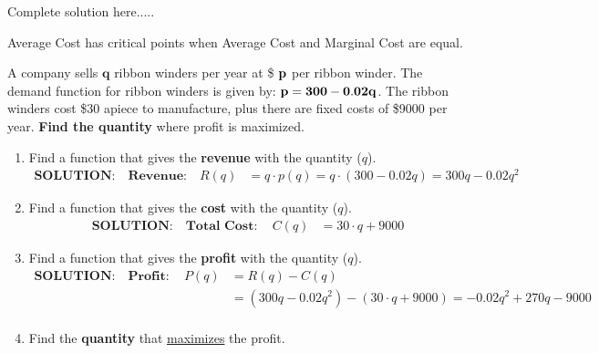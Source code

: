 \begin{example}
\begin{sol}
    \end{sol}
    \begin{solL}
    Complete solution here.....
    
    \end{solL}
    
\end{example}

\begin{tcolorbox}
Average Cost has critical points when Average Cost and Marginal Cost are equal.
\end{tcolorbox}

\newpage
\begin{example}
A company sells $\bm q$ ribbon winders per year at \$ $\bf{p}$ per ribbon winder. The demand function for ribbon winders is given by: $\bf{p=300-0.02q}$. The ribbon winders cost \$30 apiece to manufacture, plus there are fixed costs of \$9000 per year. \textbf{Find the quantity} where profit is maximized.
\renewcommand{\labelenumi}{(\alph{enumi})}
\begin{enumerate}[leftmargin=*]
    \item Find a function that gives the \textbf{revenue} with the quantity ($q$).\\
    	\begin{displaymath}
		\begin{split}
		\textbf{SOLUTION:} \quad	\textbf{Revenue:}\quad R(q) &=q\cdot p(q)=q\cdot (300-0.02q)=300q-0.02q^2
		\end{split}
	\end{displaymath}
    \item Find a function that gives the \textbf{cost} with the quantity ($q$).\\
    	\begin{displaymath}
		\begin{split}
		\textbf{SOLUTION:} \quad	\textbf{Total Cost}:\quad C(q) &=30\cdot q+9000
		\end{split}
	\end{displaymath}
    \item Find a function that gives the \textbf{profit} with the quantity ($q$).\\
    	\begin{displaymath}
		\begin{split}
		\textbf{SOLUTION:} \quad \textbf{Profit}:\quad P(q) &=R(q)-C(q)\\
			                           &=(300q-0.02q^2)-(30\cdot q+9000)=-0.02q^2+270q-9000\\
		\end{split}
	\end{displaymath}
    \item Find the \textbf{quantity} that \underline{maximizes} the profit.
    

\end{enumerate}
\end{example}
